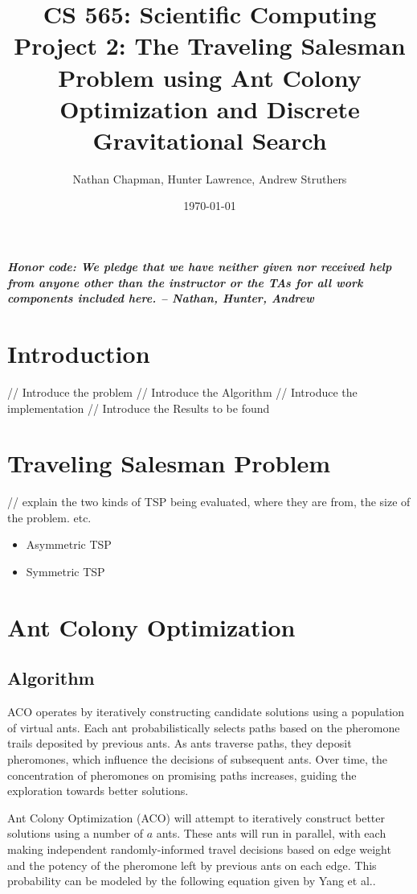 \documentclass{article}
\title{\vspace*{-0.625in}CS 565: Scientific Computing \\ Project 2: The Traveling Salesman Problem using Ant Colony Optimization and Discrete Gravitational Search\vspace*{-0.25in}}
\author{Nathan Chapman, Hunter Lawrence, Andrew Struthers}
\date{\today}
\begin{document}
\maketitle
\tableofcontents
\pagebreak
\textbf{\textit{Honor code: We pledge that we have neither given nor received help from anyone other than the instructor or the TAs for all work components included here. -- Nathan, Hunter, Andrew}}

\section{Introduction}
    // Introduce the problem
    // Introduce the Algorithm
    // Introduce the implementation
    // Introduce the Results to be found

\section{Traveling Salesman Problem}
    // explain the two kinds of TSP being evaluated, where they are from, the size of the problem. etc.

    \begin{itemize}
        \item Asymmetric TSP
        \item Symmetric TSP
    \end{itemize}

\section{Ant Colony Optimization}

\subsection{Algorithm}
ACO operates by iteratively constructing candidate solutions using a population of virtual ants. Each ant probabilistically selects paths based on the pheromone trails deposited by previous ants. As ants traverse paths, they deposit pheromones, which influence the decisions of subsequent ants. Over time, the concentration of pheromones on promising paths increases, guiding the exploration towards better solutions.

Ant Colony Optimization (ACO) will attempt to iteratively construct better solutions using a number of $a$ ants. These ants will run in parallel, with each making independent randomly-informed travel decisions based on edge weight and the potency of the pheromone left by previous ants on each edge. This probability can be modeled by the following equation given by Yang et al.\cite{yang2008ant}.
\end{document}
